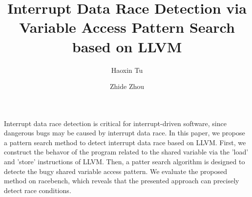 \documentclass[acmsmall]{acmart}
\begin{document}
\title{Interrupt Data Race Detection via Variable Access Pattern Search based on LLVM
 }

\author{Haoxin Tu}
\author{Zhide Zhou}









\maketitle




Interrupt data race detection is critical for interrupt-driven software, 
since dangerous bugs may be caused by interrupt data race. In this paper, 
we propose a pattern search method to detect interrupt data race based on LLVM. 
First, we construct the behavor of the program related to the shared variable via 
the 'load' and 'store' instructions of LLVM. Then, a patter search algorithm is designed 
to detecte the bugy shared variable access pattern. We evaluate the proposed method on racebench, 
which reveals that the presented approach can precisely detect race conditions.
\end{document}
